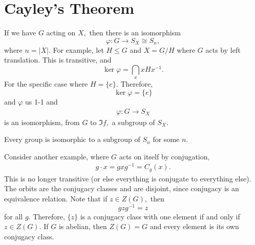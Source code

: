 \documentclass{article}
\numberwithin{equation}{section}
\begin{document}
\section*{Cayley's Theorem}
If we have $G$ acting on $X,$ then there is an isomorphism 
\begin{equation*}
    \varphi: G \to S_X \cong S_n,
\end{equation*}
where $n=|X|.$ For example, let $H \le G$ and $X=G/H$ where $G$ acts by left translation. This is transitive, and 
\begin{equation*}
    \ker \varphi = \bigcap_{x} xHx^{-1}.
\end{equation*}
For the specific case where $H=\{e\}.$ Therefore, 
\begin{equation*}
    \ker\varphi = \{e\}
\end{equation*}
and $\varphi$ us 1-1 and 
\begin{align*}
    \varphi: G \to S_X
\end{align*}
is an isomorphism, from $G$ to $\Im f,$ a subgroup of $S_X.$
\begin{theorem}
    Every group is isomorphic to a subgroup of $S_n$ for some $n.$
\end{theorem}
Consider another example, where $G$ acts on itself by conjugation,
\begin{align*}
    g \cdot x = gxg^{-1} = C_g(x).
\end{align*}
This is no longer transitive (or else everything is conjugate to everything else). The orbits are the conjugacy classes and are disjoint, since conjugacy is an equivalence relation. Note that if $z\in Z(G),$ then 
\begin{equation*}
    gzg^{-1} = z
\end{equation*}
for all $g.$ Therefore, $\{z\}$ is a conjugacy class with one element if and only if $z\in Z(G).$ If $G$ is abelian, then $Z(G)=G$ and every element is its own conjugacy class.
\end{document}
